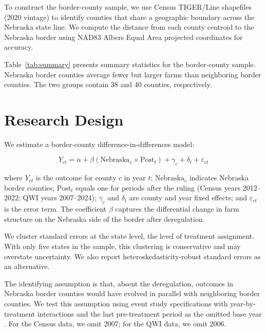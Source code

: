 \documentclass[12pt]{article}
\begin{document}
To construct the border-county sample, we use Census TIGER/Line shapefiles (2020 vintage) to identify counties that share a geographic boundary across the Nebraska state line. We compute the distance from each county centroid to the Nebraska border using NAD83 Albers Equal Area projected coordinates for accuracy.

Table~\ref{tab:summary} presents summary statistics for the border-county sample. Nebraska border counties average fewer but larger farms than neighboring border counties. The two groups contain 38 and 40 counties, respectively.



\section{Research Design}\label{sec:design}

We estimate a border-county difference-in-differences model:

\begin{equation}\label{eq:main}
Y_{ct} = \alpha + \beta (\text{Nebraska}_c \times \text{Post}_t) + \gamma_c + \delta_t + \varepsilon_{ct}
\end{equation}

\noindent where $Y_{ct}$ is the outcome for county $c$ in year $t$; $\text{Nebraska}_c$ indicates Nebraska border counties; $\text{Post}_t$ equals one for periods after the ruling (Census years 2012--2022; QWI years 2007--2024); $\gamma_c$ and $\delta_t$ are county and year fixed effects; and $\varepsilon_{ct}$ is the error term. The coefficient $\beta$ captures the differential change in farm structure on the Nebraska side of the border after deregulation.

We cluster standard errors at the state level, the level of treatment assignment. With only five states in the sample, this clustering is conservative and may overstate uncertainty. We also report heteroskedasticity-robust standard errors as an alternative.

The identifying assumption is that, absent the deregulation, outcomes in Nebraska border counties would have evolved in parallel with neighboring border counties. We test this assumption using event study specifications with year-by-treatment interactions and the last pre-treatment period as the omitted base year \citep{Roth2023}. For the Census data, we omit 2007; for the QWI data, we omit 2006.
\end{document}

